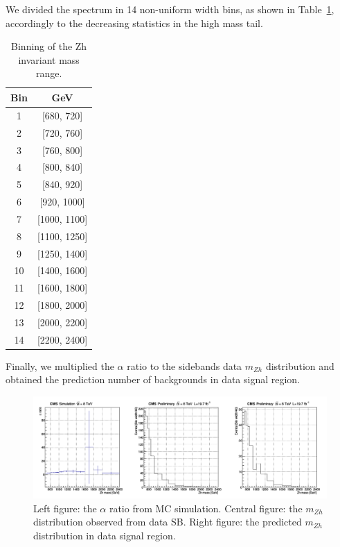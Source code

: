 We divided the spectrum in 14 non-uniform width bins, as shown in Table~\ref{tab:bin}, accordingly to the decreasing statistics in the high mass tail.

\begin{center}
  \begin{table}[h]
    \begin{center}
      \begin{tabular}{c|c}
        \hline
        \bf Bin & \bf GeV \\
        \hline
        \hline
        1 & [680, 720] \\
        2 & [720, 760] \\
        3 & [760, 800] \\
        4 & [800, 840] \\
        5 & [840, 920] \\
        6 & [920, 1000] \\
        7 & [1000, 1100] \\
        8 & [1100, 1250] \\
        9 & [1250, 1400] \\
        10 & [1400, 1600] \\
        11 & [1600, 1800] \\
        12 & [1800, 2000] \\
        13 & [2000, 2200] \\
        14 & [2200, 2400] \\
        \hline
      \end{tabular}
    \end{center}
    \caption{\label{tab:bin}Binning of the Zh invariant mass range.}
  \end{table}
\end{center}

Finally, we multiplied the $\alpha$ ratio to the sidebands data $m_{Zh}$ distribution and obtained the prediction number of backgrounds in data signal region.

\begin{figure}[hbtp]
  \begin{center}
    \includegraphics[width=\textwidth]{figure/CH3/alpha_new.png}
  \end{center}
  \caption{\label{fig:alpha}Left figure: the $\alpha$ ratio from MC simulation. Central figure: the $m_{Zh}$ distribution observed from data SB. Right figure: the predicted $m_{Zh}$ distribution in data signal region. }
\end{figure}


